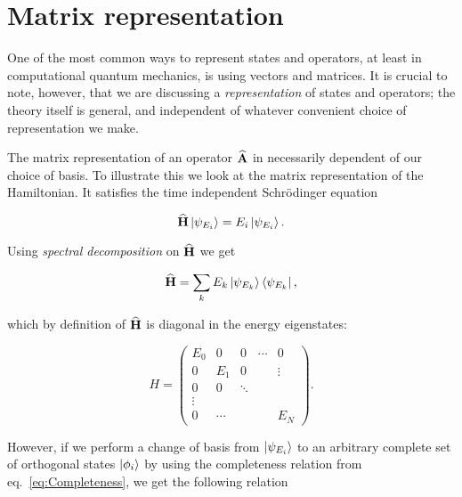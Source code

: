 \chapter{Matrix representation}

One of the most common ways to represent states and operators, at least in computational quantum mechanics, is using vectors and matrices. It is crucial to note, however, that we are discussing a \textit{representation} of states and operators; the theory itself is general, and independent of whatever convenient choice of representation we make. 

The matrix representation of an operator ${\bf\widehat{A}}$ in necessarily dependent of our choice of basis. To illustrate this we look at the matrix representation of the Hamiltonian. It satisfies the time independent Schrödinger equation

\[
 {\bf\widehat{H}}\left| \psi_{E_i} \right> = E_i\left| \psi_{E_i} \right>.
\]

Using \textit{spectral decomposition} on ${\bf\widehat{H}}$ we get

\begin{equation}
 {\bf\widehat{H}} = \sum_{k} E_k\left| \psi_{E_k} \right>\left< \psi_{E_k} \right|, \label{eq:spectralHamiltonian}
\end{equation}

which by definition of ${\bf\widehat{H}}$ is diagonal in the energy eigenstates:

\begin{equation}
H = \left( 
\begin{array}{ccccc}
E_0    & 0      & 0      & \cdots & 0      \\
0      & E_1    & 0      &        & \vdots \\
0      & 0      & \ddots &        &        \\
\vdots &        &        &        &        \\
0      & \cdots &        &        & E_N
\end{array} \right).
\end{equation}

However, if we perform a change of basis from $\left| \psi_{E_i} \right>$ to an arbitrary complete set of orthogonal states $\left| \phi_i \right>$ by using the completeness relation from eq.~\ref{eq:Completeness}, we get the following relation

